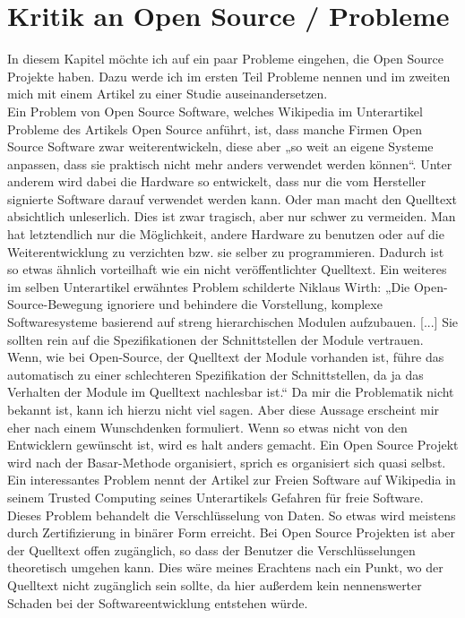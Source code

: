 \documentclass[a4paper,12pt]{article}
\begin{document}
\section{Kritik an Open Source / Probleme}
In diesem Kapitel möchte ich auf ein paar Probleme eingehen, die Open Source Projekte haben. Dazu werde ich im ersten Teil Probleme nennen und im zweiten mich mit einem Artikel zu einer Studie auseinandersetzen.\\
Ein Problem von Open Source Software, welches Wikipedia im Unterartikel Probleme des Artikels Open Source anführt, ist, dass manche Firmen Open Source Software zwar weiterentwickeln, diese aber „so weit an eigene Systeme anpassen, dass sie praktisch nicht mehr anders verwendet werden können“. Unter anderem wird dabei die Hardware so entwickelt, dass nur die vom Hersteller signierte Software darauf verwendet werden kann. Oder man macht den Quelltext absichtlich unleserlich. Dies ist zwar tragisch, aber nur schwer zu vermeiden. Man hat letztendlich nur die Möglichkeit, andere Hardware zu benutzen oder auf die Weiterentwicklung zu verzichten bzw. sie selber zu programmieren. Dadurch ist so etwas ähnlich vorteilhaft wie ein nicht veröffentlichter Quelltext. Ein weiteres im selben Unterartikel erwähntes Problem schilderte Niklaus Wirth: „Die Open-Source-Bewegung ignoriere und behindere die Vorstellung, komplexe Softwaresysteme basierend auf streng hierarchischen Modulen aufzubauen. [...] Sie sollten rein auf die Spezifikationen der Schnittstellen der Module vertrauen. Wenn, wie bei Open-Source, der Quelltext der Module vorhanden ist, führe das automatisch zu einer schlechteren Spezifikation der Schnittstellen, da ja das Verhalten der Module im Quelltext nachlesbar ist.“ Da mir die Problematik nicht bekannt ist, kann ich hierzu nicht viel sagen. Aber diese Aussage erscheint mir eher nach einem Wunschdenken formuliert. Wenn so etwas nicht von den Entwicklern gewünscht ist, wird es halt anders gemacht. Ein Open Source Projekt wird nach der Basar-Methode organisiert, sprich es organisiert sich quasi selbst. Ein interessantes Problem nennt der Artikel zur Freien Software auf Wikipedia in seinem Trusted Computing seines Unterartikels Gefahren für freie Software. Dieses Problem behandelt die Verschlüsselung von Daten. So etwas wird meistens durch Zertifizierung in binärer Form erreicht. Bei Open Source Projekten ist aber der Quelltext offen zugänglich, so dass der Benutzer die Verschlüsselungen theoretisch umgehen kann. Dies wäre meines Erachtens nach ein Punkt, wo der Quelltext nicht zugänglich sein sollte, da hier außerdem kein nennenswerter Schaden bei der Softwareentwicklung entstehen würde.\\
\end{document}
